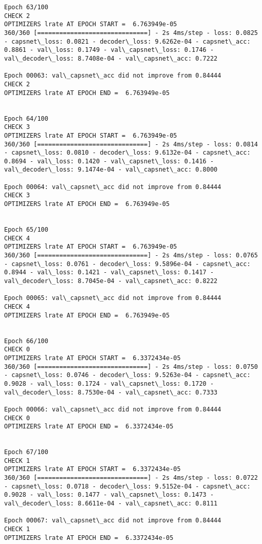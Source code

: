 \documentclass[11pt]{article}
\begin{document}
\begin{Verbatim}[commandchars=\\\{\}]
Epoch 63/100
CHECK 2
OPTIMIZERS lrate AT EPOCH START =  6.763949e-05
360/360 [==============================] - 2s 4ms/step - loss: 0.0825 - capsnet\_loss: 0.0821 - decoder\_loss: 9.6262e-04 - capsnet\_acc: 0.8861 - val\_loss: 0.1749 - val\_capsnet\_loss: 0.1746 - val\_decoder\_loss: 8.7408e-04 - val\_capsnet\_acc: 0.7222

Epoch 00063: val\_capsnet\_acc did not improve from 0.84444
CHECK 2
OPTIMIZERS lrate AT EPOCH END =  6.763949e-05 


Epoch 64/100
CHECK 3
OPTIMIZERS lrate AT EPOCH START =  6.763949e-05
360/360 [==============================] - 2s 4ms/step - loss: 0.0814 - capsnet\_loss: 0.0810 - decoder\_loss: 9.6132e-04 - capsnet\_acc: 0.8694 - val\_loss: 0.1420 - val\_capsnet\_loss: 0.1416 - val\_decoder\_loss: 9.1474e-04 - val\_capsnet\_acc: 0.8000

Epoch 00064: val\_capsnet\_acc did not improve from 0.84444
CHECK 3
OPTIMIZERS lrate AT EPOCH END =  6.763949e-05 


Epoch 65/100
CHECK 4
OPTIMIZERS lrate AT EPOCH START =  6.763949e-05
360/360 [==============================] - 2s 4ms/step - loss: 0.0765 - capsnet\_loss: 0.0761 - decoder\_loss: 9.5896e-04 - capsnet\_acc: 0.8944 - val\_loss: 0.1421 - val\_capsnet\_loss: 0.1417 - val\_decoder\_loss: 8.7045e-04 - val\_capsnet\_acc: 0.8222

Epoch 00065: val\_capsnet\_acc did not improve from 0.84444
CHECK 4
OPTIMIZERS lrate AT EPOCH END =  6.763949e-05 


Epoch 66/100
CHECK 0
OPTIMIZERS lrate AT EPOCH START =  6.3372434e-05
360/360 [==============================] - 2s 4ms/step - loss: 0.0750 - capsnet\_loss: 0.0746 - decoder\_loss: 9.5263e-04 - capsnet\_acc: 0.9028 - val\_loss: 0.1724 - val\_capsnet\_loss: 0.1720 - val\_decoder\_loss: 8.7530e-04 - val\_capsnet\_acc: 0.7333

Epoch 00066: val\_capsnet\_acc did not improve from 0.84444
CHECK 0
OPTIMIZERS lrate AT EPOCH END =  6.3372434e-05 


Epoch 67/100
CHECK 1
OPTIMIZERS lrate AT EPOCH START =  6.3372434e-05
360/360 [==============================] - 2s 4ms/step - loss: 0.0722 - capsnet\_loss: 0.0718 - decoder\_loss: 9.5152e-04 - capsnet\_acc: 0.9028 - val\_loss: 0.1477 - val\_capsnet\_loss: 0.1473 - val\_decoder\_loss: 8.6611e-04 - val\_capsnet\_acc: 0.8111

Epoch 00067: val\_capsnet\_acc did not improve from 0.84444
CHECK 1
OPTIMIZERS lrate AT EPOCH END =  6.3372434e-05 



\end{Verbatim}
\end{document}
